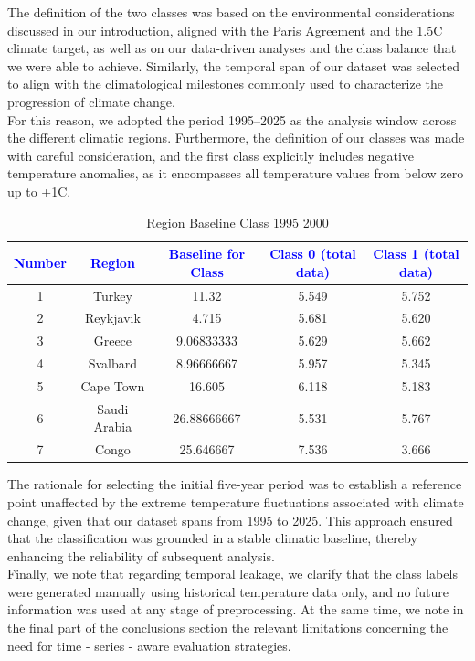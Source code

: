 \documentclass[12pt]{Definitions/academia}
\begin{document}
The definition of the two classes was based on the environmental considerations
discussed in our introduction, aligned with the Paris Agreement and
the 1.5\textdegree C climate target, as well as on our data-driven analyses
and the class balance that we were able to achieve. Similarly, the
temporal span of our dataset was selected to align with the climatological
milestones commonly used to characterize the progression of climate
change.\\
 For this reason, we adopted the period 1995--2025 as the
analysis window across the different climatic regions. Furthermore,
the definition of our classes was made with careful consideration,
and the first class explicitly includes negative temperature anomalies,
as it encompasses all temperature values from below zero up to +1\textdegree C.

\begin{table}[H]

\begin{tabular}{|c|c|c|c|c|}
\hline
\textbf{\textcolor{blue}{Number}} & \textbf{\textcolor{blue}{Region}} & \textbf{\textcolor{blue}{Baseline for Class}} & \textbf{\textcolor{blue}{Class 0 (total data)}} & \textbf{\textcolor{blue}{Class 1 (total data)}}\tabularnewline
\hline
\hline
1 & Turkey & 11.32 & 5.549 & 5.752\tabularnewline
\hline
2 & Reykjavik & 4.715 & 5.681 & 5.620\tabularnewline
\hline
3 & Greece & 9.06833333 & 5.629 & 5.662\tabularnewline
\hline
4 & Svalbard & 8.96666667 & 5.957 & 5.345\tabularnewline
\hline
5 & Cape Town & 16.605 & 6.118 & 5.183\tabularnewline
\hline
6 & Saudi Arabia & 26.88666667 & 5.531 & 5.767\tabularnewline
\hline
7 & Congo & 25.646667 & 7.536 & 3.666\tabularnewline
\hline
\end{tabular}

\caption{Region Baseline Class 1995 2000\label{tab:Table-4-Region-Baseline-Class}}

\end{table}

The rationale for selecting the initial five-year period was to establish
a reference point unaffected by the extreme temperature fluctuations
associated with climate change, given that our dataset spans from
1995 to 2025. This approach ensured that the classification was grounded
in a stable climatic baseline, thereby enhancing the reliability of
subsequent analysis.\\
{Finally, we note that regarding temporal leakage, we clarify that the class labels were generated manually using historical temperature data only, and no future information was used at any stage of preprocessing. At the same time, we note in the final part of the conclusions section the relevant limitations concerning the need for time - series - aware evaluation strategies.}
\end{document}
